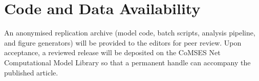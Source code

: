 \documentclass{JASSS}
\begin{document}
\section*{Code and Data Availability}
An anonymised replication archive (model code, batch scripts, analysis pipeline, and figure generators) will be provided to the editors for peer review. Upon acceptance, a reviewed release will be deposited on the CoMSES Net Computational Model Library so that a permanent handle can accompany the published article.

\endparano

\theendnotes



\end{document}
